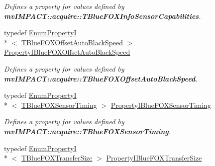 \begin{DoxyCompactItemize}
\begin{DoxyCompactList}\small\item\em Defines a property for values defined by {\bfseries mv\+I\+M\+P\+A\+C\+T\+::acquire\+::\+T\+Blue\+F\+O\+X\+Info\+Sensor\+Capabilities}. \end{DoxyCompactList}\item 
\hypertarget{group___device_specific_interface_ga748b74d12ddf41831cc263b764026029}{typedef \hyperlink{classmv_i_m_p_a_c_t_1_1acquire_1_1_enum_property_i}{Enum\+Property\+I}\\*
$<$ \hyperlink{group___device_specific_interface_ga6858da05a066281204fc6a18c037da1c}{T\+Blue\+F\+O\+X\+Offset\+Auto\+Black\+Speed} $>$ \hyperlink{group___device_specific_interface_ga748b74d12ddf41831cc263b764026029}{Property\+I\+Blue\+F\+O\+X\+Offset\+Auto\+Black\+Speed}}\label{group___device_specific_interface_ga748b74d12ddf41831cc263b764026029}

\begin{DoxyCompactList}\small\item\em Defines a property for values defined by {\bfseries mv\+I\+M\+P\+A\+C\+T\+::acquire\+::\+T\+Blue\+F\+O\+X\+Offset\+Auto\+Black\+Speed}. \end{DoxyCompactList}\item 
\hypertarget{group___device_specific_interface_ga45fd35a32780ef2617233fe593eb9c1f}{typedef \hyperlink{classmv_i_m_p_a_c_t_1_1acquire_1_1_enum_property_i}{Enum\+Property\+I}\\*
$<$ \hyperlink{group___device_specific_interface_gadd4b25a331e78a5cbe1478ba1e96fa4d}{T\+Blue\+F\+O\+X\+Sensor\+Timing} $>$ \hyperlink{group___device_specific_interface_ga45fd35a32780ef2617233fe593eb9c1f}{Property\+I\+Blue\+F\+O\+X\+Sensor\+Timing}}\label{group___device_specific_interface_ga45fd35a32780ef2617233fe593eb9c1f}

\begin{DoxyCompactList}\small\item\em Defines a property for values defined by {\bfseries mv\+I\+M\+P\+A\+C\+T\+::acquire\+::\+T\+Blue\+F\+O\+X\+Sensor\+Timing}. \end{DoxyCompactList}\item 
\hypertarget{group___device_specific_interface_gaae90f3807daf211cdd7b687603d2f787}{typedef \hyperlink{classmv_i_m_p_a_c_t_1_1acquire_1_1_enum_property_i}{Enum\+Property\+I}\\*
$<$ \hyperlink{group___device_specific_interface_ga3d85571ec2d787bc90e363a8955eca11}{T\+Blue\+F\+O\+X\+Transfer\+Size} $>$ \hyperlink{group___device_specific_interface_gaae90f3807daf211cdd7b687603d2f787}{Property\+I\+Blue\+F\+O\+X\+Transfer\+Size}}\label{group___device_specific_interface_gaae90f3807daf211cdd7b687603d2f787}


\end{DoxyCompactItemize}
